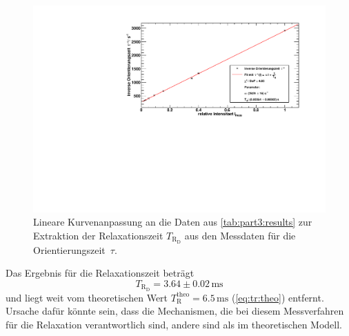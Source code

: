 \begin{figure}[H]
\begin{center}
  \includegraphics[width=\textwidth]{../img/part5/taufit.pdf}
  \caption{Lineare Kurvenanpassung an die Daten aus \autoref{tab:part3:results} zur Extraktion
  der Relaxationszeit $T_{\text{R}_\text{D}}$ aus den Messdaten für die Orientierungszeit~$\tau$.}
  \label{img:deh:relaxtime}
\end{center}
\end{figure}

Das Ergebnis für die Relaxationszeit beträgt
\begin{equation}
  T_{\text{R}_\text{D}} = 3.64 \pm 0.02\,\text{ms}
\end{equation}
und liegt weit vom theoretischen Wert $T_\text{R}^\text{theo} = 6.5\,\text{ms}$ (\autoref{eq:tr:theo}) entfernt.
Ursache dafür könnte sein, dass die Mechanismen, die bei diesem Messverfahren
für die Relaxation verantwortlich sind, andere sind als im theoretischen Modell.



